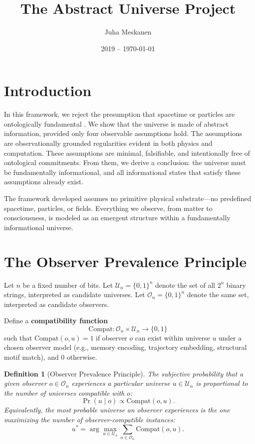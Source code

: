 \documentclass[11pt]{article}
\title{\LARGE The Abstract Universe Project}
\author{Juha Meskanen}
\date{2019 -- \today}
\newtheorem{definition}{Definition}
\begin{document}
\maketitle

\section{Introduction}

In this framework, we reject the presumption that spacetime or particles are ontologically fundamental \cite{wheeler1990it} . We show that the universe is made of abstract information, provided only four observable assumptions hold. The assumptions are observationally grounded regularities evident in both physics and computation. These assumptions are minimal, falsifiable, and intentionally free of ontological commitments. From them, we derive a conclusion: the universe must be fundamentally informational, and all informational states that satisfy these assumptions already exist.

The framework developed assumes no primitive physical substrate—no predefined spacetime, particles, or fields. Everything we observe, from matter to consciousness, is modeled as an emergent structure within a fundamentally informational universe.


\section*{The Observer Prevalence Principle}

Let $n$ be a fixed number of bits. Let $\mathcal{U}_n = \{0,1\}^n$ denote the set of all $2^n$ binary strings, interpreted as candidate universes. Let $\mathcal{O}_n = \{0,1\}^n$ denote the same set, interpreted as candidate observers.

Define a \textbf{compatibility function}
\[
      \mathrm{Compat}: \mathcal{O}_n \times \mathcal{U}_n \rightarrow \{0,1\}
\]
such that $\mathrm{Compat}(o, u) = 1$ if observer $o$ can exist within universe $u$ under a chosen observer model (e.g., memory encoding, trajectory embedding, structural motif match), and 0 otherwise.

\begin{definition}[Observer Prevalence Principle]
      The \emph{subjective probability} that a given observer $o \in \mathcal{O}_n$ experiences a particular universe $u \in \mathcal{U}_n$ is proportional to the number of universes compatible with $o$:
      \[
            \Pr(u \mid o) \propto \mathrm{Compat}(o, u).
      \]
      Equivalently, the most probable universe an observer experiences is the one maximizing the number of observer-compatible instances:
      \[
            u^* = \arg\max_{u \in \mathcal{U}_n} \sum_{o \in \mathcal{O}_n} \mathrm{Compat}(o, u).
      \]
\end{definition}
\end{document}
